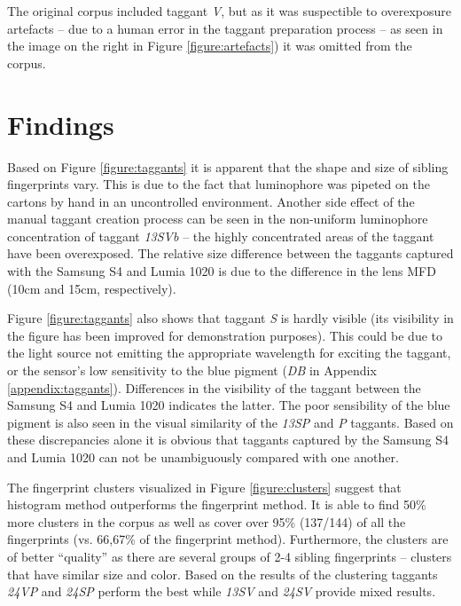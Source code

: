 \documentclass[thesis.tex]{subfiles}
\begin{document}
The original corpus included taggant \emph{V}, but as it was suspectible to overexposure artefacts -- due to a human error in the taggant preparation process -- as seen in the image on the right in Figure \ref{figure:artefacts}) it was omitted from the corpus.

\section{Findings}
\label{chapter:findings}

Based on Figure \ref{figure:taggants} it is apparent that the shape and size of sibling fingerprints vary. This is due to the fact that luminophore was pipeted on the cartons by hand in an uncontrolled environment. Another side effect of the manual taggant creation process can be seen in the non-uniform luminophore concentration of taggant \emph{13SVb} -- the highly concentrated areas of the taggant have been overexposed. The relative size difference between the taggants captured with the Samsung S4 and Lumia 1020 is due to the difference in the lens MFD (10cm and 15cm, respectively).

Figure \ref{figure:taggants} also shows that taggant \emph{S} is hardly visible (its visibility in the figure has been improved for demonstration purposes). This could be due to the light source not emitting the appropriate wavelength for exciting the taggant, or the sensor's low sensitivity to the blue pigment (\emph{DB} in Appendix \ref{appendix:taggants}). Differences in the visibility of the taggant between the Samsung S4 and Lumia 1020 indicates the latter. The poor sensibility of the blue pigment is also seen in the visual similarity of the \emph{13SP} and \emph{P} taggants. Based on these discrepancies alone it is obvious that taggants captured by the Samsung S4 and Lumia 1020 can not be unambiguously compared with one another.

The fingerprint clusters visualized in Figure \ref{figure:clusters} suggest that histogram method outperforms the fingerprint method. It is able to find 50\% more clusters in the corpus as well as cover over 95\% (137/144) of all the fingerprints (vs. 66,67\% of the fingerprint method). Furthermore, the clusters are of better ``quality'' as there are several groups of 2-4 sibling fingerprints -- clusters that have similar size and color. Based on the results of the clustering taggants \emph{24VP} and \emph{24SP} perform the best while \emph{13SV} and \emph{24SV} provide mixed results.
\end{document}
